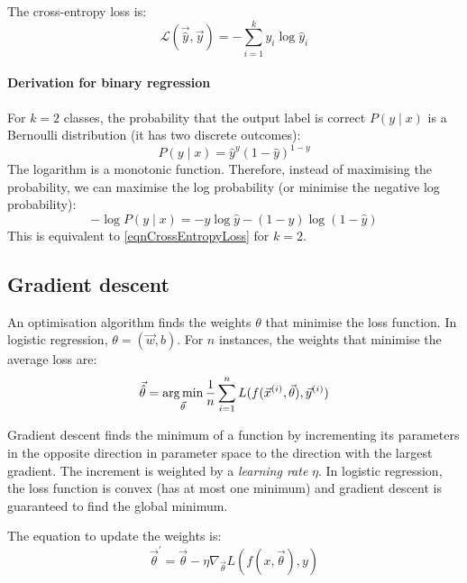 The cross-entropy loss is:
\begin{equation}
  \label{eqnCrossEntropyLoss}
  \mathcal{L}(\vec{\hat{y}}, \vec{y}) = - \sum_{i = 1}^{k} y_i \log \hat{y}_i
\end{equation}

\paragraph{Derivation for binary regression}

For $k = 2$ classes, the probability that the output label is correct $P(y \mid x)$ is a Bernoulli distribution (it has two discrete outcomes):
\begin{equation}
  \label{eqnDerivation1}
  P(y \mid x) = \hat{y}^y (1 - \hat{y})^{1 - y}
\end{equation}
The logarithm is a
monotonic function.
Therefore, instead of maximising the probability, we can maximise the log probability (or minimise the negative log probability):
\begin{equation}
  \label{eqnDerivation2}
  - \log P(y \mid x) = - y \log \hat{y} - (1 - y) \log (1 - \hat{y})
\end{equation}
This is equivalent to \ref{eqnCrossEntropyLoss} for $k = 2$.

\subsection{Gradient descent}

An optimisation algorithm finds the weights $\theta$ that minimise the loss
function.
In logistic regression, $\theta = (\vec{w}, b)$.
For $n$ instances, the weights that minimise the average loss are:
\begin{equation}
  \label{eqnWeightsOptimal}
  \vec{\hat{\theta}} = \operatorname*{arg\,min}_{\vec{\theta}} \frac{1}{n} \sum_{i = 1}^{n}
  L(f(\vec{x}^{(i)}, \vec{\theta}), \vec{y}^{(i)})
\end{equation}

Gradient descent finds the minimum of a function by
incrementing its parameters in the opposite direction in parameter space to the
direction with the largest gradient.
The increment is weighted by a \textit{learning rate} $\eta$.
In logistic regression, the loss function is convex (has at most one minimum)
and gradient descent is guaranteed to find the global minimum.

The equation to update the weights is:
\begin{equation}
  \label{eqnWeightsUpdate}
  \vec{\theta}^\prime = \vec{\theta} - \eta \nabla_{\vec{\theta}} L(f(x, \vec{\theta}), y)
\end{equation}

